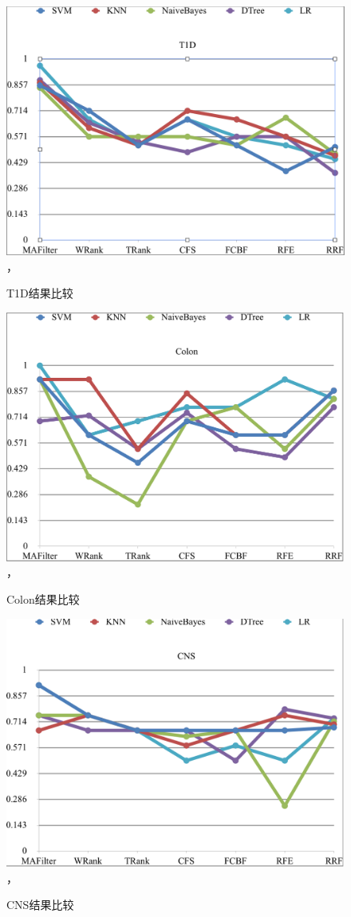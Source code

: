 \begin{figure}[!ht]
    \centering
    \includegraphics[width=5in]{pic/fig10}， 
    \caption{T1D结果比较}
\end{figure}

\begin{figure}[!ht]
    \centering
    \includegraphics[width=5in]{pic/fig11}， 
    \caption{Colon结果比较}
\end{figure}

\begin{figure}[!ht]
    \centering
    \includegraphics[width=5in]{pic/fig12}， 
    \caption{CNS结果比较}
\end{figure}